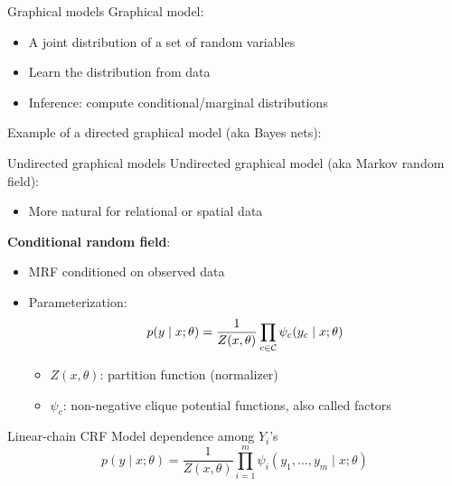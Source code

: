 \documentclass[usenames,dvipsnames,notes]{beamer}
\begin{document}
\begin{frame}
    {Graphical models}
    Graphical model:\\
    \begin{itemize}
        \item A joint distribution of a set of random variables
        \item Learn the distribution from data
        \item Inference: compute conditional/marginal distributions
    \end{itemize}

    Example of a directed graphical model (aka Bayes nets):\\
    \vspace{8em}

\end{frame}

\begin{frame}
    {Undirected graphical models}
    Undirected graphical model (aka Markov random field):\\
    \begin{itemize}
        \item More natural for relational or spatial data 
    \end{itemize}

    \textbf{Conditional random field}:\\
    \begin{itemize}
        \item MRF conditioned on observed data
        \item Parameterization:
            $$
            p(y\mid x; \theta) = \frac{1}{Z(x, \theta)}\prod_{c\in\mathcal{C}}\psi_c(y_c\mid x; \theta)
            $$
            \begin{itemize}
                \item $Z(x,\theta)$: partition function (normalizer)
                \item $\psi_c$: non-negative clique potential functions, also called factors 
            \end{itemize}
    \end{itemize}
\end{frame}

\begin{frame}
    {Linear-chain CRF}
    Model dependence among $Y_i$'s
    $$
    p(y\mid x; \theta) = \frac{1}{Z(x, \theta)}
    \prod_{i=1}^m\psi_i(y_1,\ldots, y_m\mid x; \theta) 
    $$
    \vspace{7em}
\end{frame}
\end{document}

